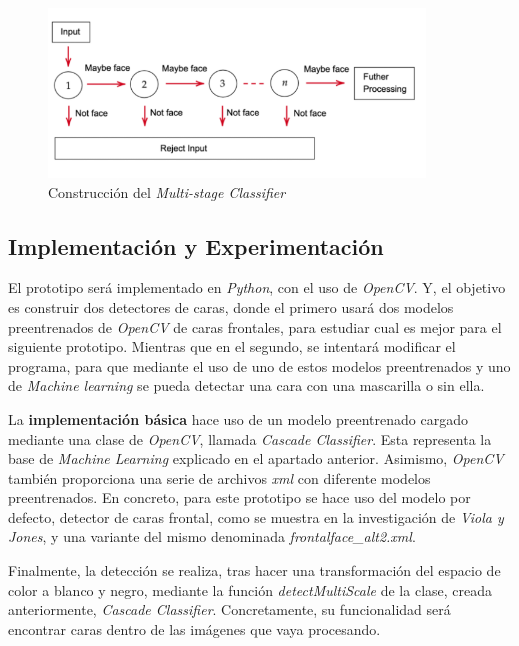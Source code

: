 \begin{figure}[htp]
	\centering
	\includegraphics[width=10cm]{imagenes/ada2.png}
	\caption{Construcción del \textit{Multi-stage Classifier}}
	\label{fig:ada2}
\end{figure}


\subsection*{Implementación y Experimentación}

El prototipo será implementado en \textit{Python}, con el uso de \textit{OpenCV}. Y, el objetivo es construir dos detectores de caras, donde el primero usará dos modelos preentrenados de \textit{OpenCV} de caras frontales, para estudiar cual es mejor para el siguiente prototipo. Mientras que en el segundo, se intentará modificar el programa, para que mediante el uso de uno de estos modelos preentrenados y uno de \textit{Machine learning} se pueda detectar una cara con una mascarilla o sin ella.

La \textbf{implementación básica} hace uso de un modelo preentrenado cargado mediante una clase de \textit{OpenCV}, llamada \textit{Cascade Classifier}. Esta representa la base de \textit{Machine Learning} explicado en el apartado anterior. Asimismo, \textit{OpenCV} también proporciona una serie de archivos \textit{xml} con diferente modelos preentrenados. En concreto, para este prototipo se hace uso del modelo por defecto, detector de caras frontal, como se muestra en la investigación de \textit{Viola y Jones}, y una variante del mismo denominada \textit{frontalface\_alt2.xml}.

Finalmente, la detección se realiza, tras hacer una transformación del espacio de color a blanco y negro, mediante la función \textit{detectMultiScale} de la clase, creada anteriormente, \textit{Cascade Classifier}. Concretamente, su funcionalidad será encontrar caras dentro de las imágenes que vaya procesando.

